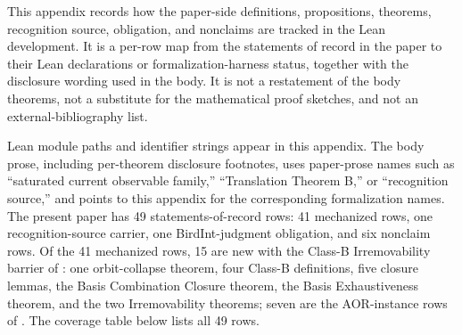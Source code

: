\documentclass[11pt]{article}
\theoremstyle{definition}
\begin{document}
This appendix records how the paper-side definitions, propositions,
theorems, recognition source, obligation, and nonclaims are tracked in
the Lean development.  It is a per-row map from the statements of
record in the paper to their Lean declarations or formalization-harness
status, together with the disclosure wording used in the body.  It is
not a restatement of the body theorems, not a substitute for the
mathematical proof sketches, and not an external-bibliography list.

Lean module paths and identifier strings appear in this appendix.  The
body prose, including per-theorem disclosure footnotes, uses paper-prose
names such as ``saturated current observable family,'' ``Translation
Theorem B,'' or ``recognition source,'' and points to this appendix for
the corresponding formalization names.  The present
paper has 49 statements-of-record rows: 41 mechanized rows, one
recognition-source carrier, one BirdInt-judgment obligation, and six
nonclaim rows.  Of the 41 mechanized rows, 15 are new with the Class-B
Irremovability barrier of
: one orbit-collapse theorem, four Class-B
definitions, five closure lemmas, the Basis Combination Closure
theorem, the Basis Exhaustiveness theorem, and the two Irremovability
theorems; seven are the AOR-instance rows of
.  The coverage table below lists all 49
rows.
\end{document}
